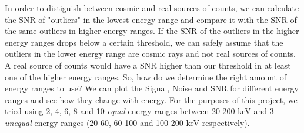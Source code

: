 \documentclass[11pt]{book} %
\begin{document}
In order to distiguish between cosmic and real sources of counts, we can calculate the SNR of "outliers" in the lowest energy range and compare it with the SNR of the same outliers in higher energy ranges. If the SNR of the outliers in the higher energy ranges drops below a certain threshold, we can safely assume that the outliers in the lower energy range are cosmic rays and not real sources of counts. A real source of counts would have a SNR higher than our threshold in at least one of the higher energy ranges.
\newpage
So, how do we determine the right amount of energy ranges to use? We can plot the Signal, Noise and SNR for different energy ranges and see how they change with energy. For the purposes of this project, we tried using 2, 4, 6, 8 and 10 \textit{equal} energy ranges between 20-200 keV and 3 \textit{unequal} energy ranges (20-60, 60-100 and 100-200 keV respectively).
\end{document}
